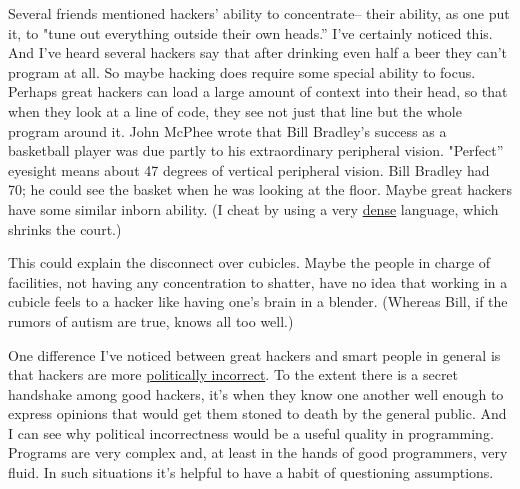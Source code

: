 Several friends
                    mentioned hackers' ability to concentrate-- their ability,
                    as one put it, to "tune out everything outside their own
                    heads.'' I've certainly noticed this. And I've heard several
                    hackers say that after drinking even half a beer they can't
                    program at all. So maybe hacking does require some special
                    ability to focus. Perhaps great hackers can load a large
                    amount of context into their head, so that when they look at
                    a line of code, they see not just that line but the whole
                    program around it. John McPhee wrote that Bill Bradley's
                    success as a basketball player was due partly to his
                    extraordinary peripheral vision. "Perfect'' eyesight means
                    about 47 degrees of vertical peripheral vision. Bill Bradley
                    had 70; he could see the basket when he was looking at the
                    floor. Maybe great hackers have some similar inborn ability.
                    (I cheat by using a very
                    \href{http://www.paulgraham.com/power.html}{dense} language, which shrinks the
                    court.)

This could explain the disconnect over
                    cubicles. Maybe the people in charge of facilities, not
                    having any concentration to shatter, have no idea that
                    working in a cubicle feels to a hacker like having one's
                    brain in a blender. (Whereas Bill, if the rumors of autism
                    are true, knows all too well.)

One difference
                    I've noticed between great hackers and smart people in
                    general is that hackers are more
                    \href{http://www.paulgraham.com/say.html}{politically incorrect}. To the extent
                    there is a secret handshake among good hackers, it's when
                    they know one another well enough to express opinions that
                    would get them stoned to death by the general public. And I
                    can see why political incorrectness would be a useful
                    quality in programming. Programs are very complex and, at
                    least in the hands of good programmers, very fluid. In such
                    situations it's helpful to have a habit of questioning
                    assumptions.

